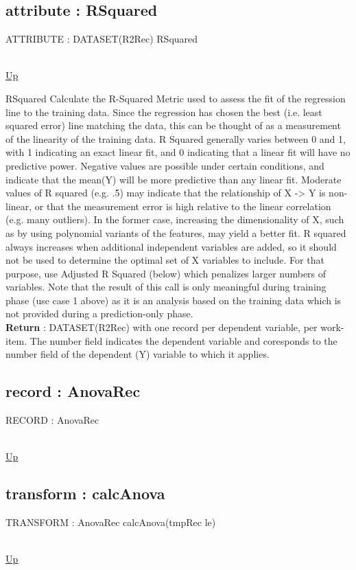 \subsection*{attribute : RSquared}
\hypertarget{ecldoc:linearregression.ols.rsquared}{ATTRIBUTE : DATASET(R2Rec) RSquared} \\
\hyperlink{ecldoc:linearregression.ols}{Up} \\
\par
RSquared Calculate the R-Squared Metric used to assess the fit of the regression line to the training data. Since the regression has chosen the best (i.e. least squared error) line matching the data, this can be thought of as a measurement of the linearity of the training data. R Squared generally varies between 0 and 1, with 1 indicating an exact linear fit, and 0 indicating that a linear fit will have no predictive power. Negative values are possible under certain conditions, and indicate that the mean(Y) will be more predictive than any linear fit. Moderate values of R squared (e.g. .5) may indicate that the relationship of X -> Y is non-linear, or that the measurement error is high relative to the linear correlation (e.g. many outliers). In the former case, increasing the dimensionality of X, such as by using polynomial variants of the features, may yield a better fit. R squared always increases when additional independent variables are added, so it should not be used to determine the optimal set of X variables to include. For that purpose, use Adjusted R Squared (below) which penalizes larger numbers of variables. Note that the result of this call is only meaningful during training phase (use case 1 above) as it is an analysis based on the training data which is not provided during a prediction-only phase. \\
\textbf{Return} : DATASET(R2Rec) with one record per dependent variable, per work-item. The number field indicates the dependent variable and coresponds to the number field of the dependent (Y) variable to which it applies. \\
\subsection*{record : AnovaRec}
\hypertarget{ecldoc:linearregression.ols.anovarec}{RECORD : AnovaRec} \\
\hyperlink{ecldoc:linearregression.ols}{Up} \\
\par
\subsection*{transform : calcAnova}
\hypertarget{ecldoc:linearregression.ols.calcanova}{TRANSFORM : AnovaRec calcAnova(tmpRec le)} \\
\hyperlink{ecldoc:linearregression.ols}{Up} \\
\par
